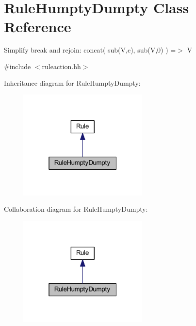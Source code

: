 \hypertarget{class_rule_humpty_dumpty}{}\section{Rule\+Humpty\+Dumpty Class Reference}
\label{class_rule_humpty_dumpty}


Simplify break and rejoin\+: {\ttfamily concat( sub(\+V,c), sub(\+V,0) ) =$>$ V}  




{\ttfamily \#include $<$ruleaction.\+hh$>$}



Inheritance diagram for Rule\+Humpty\+Dumpty\+:
\nopagebreak
\begin{figure}[H]
\begin{center}
\leavevmode
\includegraphics[width=184pt]{class_rule_humpty_dumpty__inherit__graph}
\end{center}
\end{figure}


Collaboration diagram for Rule\+Humpty\+Dumpty\+:
\nopagebreak
\begin{figure}[H]
\begin{center}
\leavevmode
\includegraphics[width=184pt]{class_rule_humpty_dumpty__coll__graph}
\end{center}
\end{figure}
